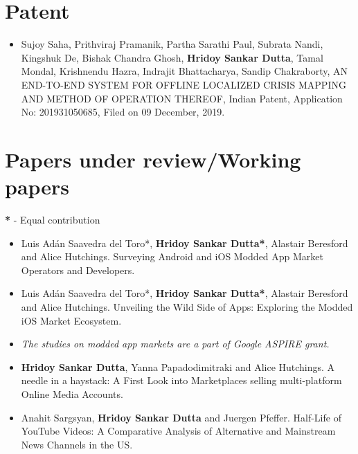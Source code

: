 \documentclass[margin, centered,lmodern]{res}
\begin{document}
\begin{resume}
\section{Patent}
\begin{itemize}[leftmargin=*]

\item Sujoy Saha,  Prithviraj Pramanik,  Partha Sarathi Paul,  Subrata Nandi,  Kingshuk De,  Bishak Chandra Ghosh,  \textbf{Hridoy Sankar Dutta},  Tamal Mondal,  Krishnendu Hazra,  Indrajit Bhattacharya,  Sandip Chakraborty,  AN END-TO-END SYSTEM FOR OFFLINE LOCALIZED CRISIS MAPPING AND METHOD OF OPERATION THEREOF,  Indian Patent,  Application No: 201931050685,  Filed on 09 December, 2019.

\end{itemize}

\section{Papers under review/Working papers}
\textbf{*} - Equal contribution
\begin{itemize}[leftmargin=*]
\item Luis Adán Saavedra del Toro*,  \textbf{Hridoy Sankar Dutta*}, Alastair Beresford and Alice Hutchings.  Surveying Android and iOS Modded App Market Operators and Developers.
\item Luis Adán Saavedra del Toro*,  \textbf{Hridoy Sankar Dutta*}, Alastair Beresford and Alice Hutchings.  Unveiling the Wild Side of Apps: Exploring the Modded iOS Market Ecosystem.
\item[] \textit{The studies on modded app markets are a part of Google ASPIRE grant.}
\item \textbf{Hridoy Sankar Dutta},  Yanna Papadodimitraki and Alice Hutchings.  A needle in a haystack: A First Look into Marketplaces selling multi-platform Online Media Accounts.
\item Anahit Sargsyan, \textbf{Hridoy Sankar Dutta} and Juergen Pfeffer.  Half-Life of YouTube Videos: A Comparative Analysis of Alternative and Mainstream News Channels in the US.
\end{itemize}



\end{resume}
\end{document}
